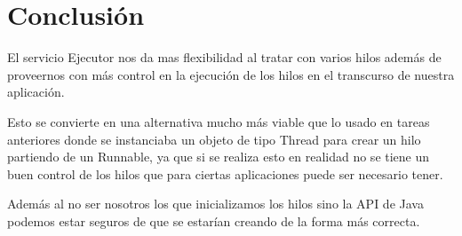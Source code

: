 \documentclass[12pt]{article}
\begin{document}
\section*{Conclusión}

El servicio Ejecutor nos da mas flexibilidad al tratar con varios
hilos además de proveernos con más control en la ejecución de los
hilos en el transcurso de nuestra aplicación.

Esto se convierte en una alternativa mucho más viable que lo usado en
tareas anteriores donde se instanciaba un objeto de tipo Thread para
crear un hilo partiendo de un Runnable, ya que si se realiza esto en
realidad no se tiene un buen control de los hilos que para ciertas
aplicaciones puede ser necesario tener.

Además al no ser nosotros los que inicializamos los hilos sino la API
de Java podemos estar seguros de que se estarían creando de la forma
más correcta.
\end{document}

